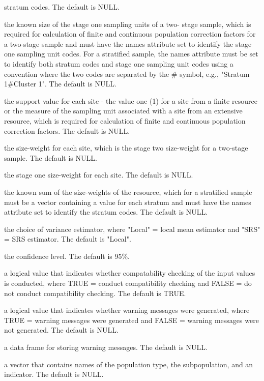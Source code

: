\begin{Arguments}
\begin{ldescription}
stratum codes.  The default is NULL.
\item[\code{stage1size}] the known size of the stage one sampling units of a two-
stage sample, which is required for calculation of finite and  
continuous population correction factors for a two-stage sample and 
must have the names attribute set to identify the stage one sampling 
unit codes.  For a stratified sample, the names attribute must be set
to identify both stratum codes and stage one sampling unit codes using
a convention where the two codes are separated by the \# symbol, e.g.,
"Stratum 1\#Cluster 1".  The default is NULL.
\item[\code{support}] the support value for each site - the value one (1) for a 
site from a finite resource or the measure of the sampling unit  
associated with a site from an extensive resource, which is required  
for calculation of finite and continuous population correction  
factors.  The default is NULL.
\item[\code{swgt}] the size-weight for each site, which is the stage two size-weight 
for a two-stage sample.  The default is NULL.
\item[\code{swgt1}] the stage one size-weight for each site.  The default is NULL.
\item[\code{unitsize}] the known sum of the size-weights of the resource, which for a 
stratified sample must be a vector containing a value for each stratum 
and must have the names attribute set to identify the stratum codes.  
The default is NULL.
\item[\code{vartype}] the choice of variance estimator, where "Local" = local mean
estimator and "SRS" = SRS estimator.  The default is "Local".
\item[\code{conf}] the confidence level.  The default is 95\%.
\item[\code{check.ind}] a logical value that indicates whether compatability
checking of the input values is conducted, where TRUE = conduct 
compatibility checking and FALSE = do not conduct compatibility 
checking.  The default is TRUE.
\item[\code{warn.ind}] a logical value that indicates whether warning messages were
generated, where TRUE = warning messages were generated and FALSE = warning
messages were not generated.  The default is NULL.
\item[\code{warn.df}] a data frame for storing warning messages.  The default is
NULL.
\item[\code{warn.vec}] a vector that contains names of the population type, the
subpopulation, and an indicator.  The default is NULL.
\end{ldescription}
\end{Arguments}
